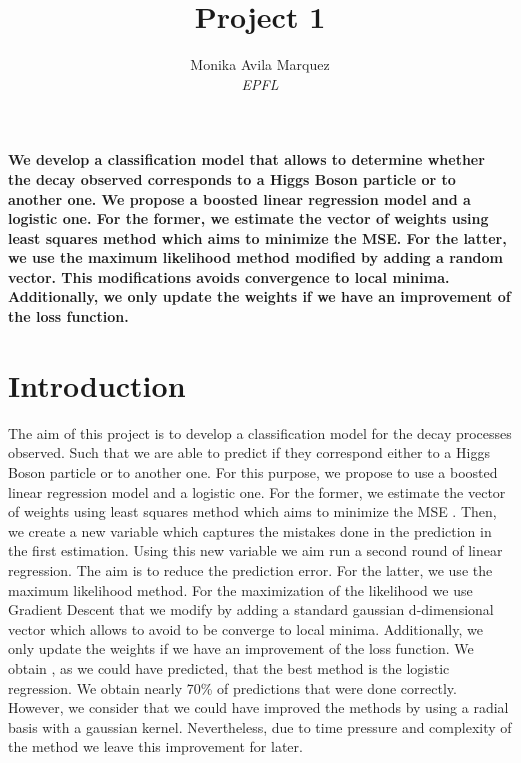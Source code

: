 \documentclass[10pt,conference,compsocconf]{IEEEtran}
\begin{document}
\title{Project 1}

\author{
  Monika Avila Marquez \\
  \textit{EPFL}
}

\maketitle

\begin{abstract}
  
\end{abstract}	\textbf{We develop a classification model that allows to determine whether the decay observed corresponds to a Higgs Boson particle or to another one. We propose a boosted linear regression model and a logistic one. For the former, we estimate the vector of weights using least squares method which aims to minimize the MSE. For the latter, we use the maximum likelihood method modified by adding a random vector. This modifications avoids convergence to local minima. Additionally, we only update the weights if we have an improvement of the loss function. }

\section{Introduction}

The aim of this project is to develop a classification model for the decay processes observed. Such that we are able to predict if they correspond either to a Higgs Boson particle or to another one. For this purpose, we propose to use a  boosted linear regression model and a logistic one. For the former, we estimate the vector of weights using least squares method which aims to minimize the MSE . Then, we create a new variable which captures the mistakes done in the prediction in the first estimation. Using this new variable we aim run a second round of linear regression. The aim is to reduce the prediction error. For the latter, we use the maximum likelihood method. For the maximization of the likelihood we use Gradient Descent that we modify by adding a standard gaussian d-dimensional vector which allows to avoid to be converge to local minima. Additionally, we only update the weights if we have an improvement of the loss function.
We obtain , as we could have predicted, that the best method is the logistic regression. We obtain nearly 70\% of predictions that were done correctly. 
However, we consider that we could have improved the methods by using a radial basis with a gaussian kernel. Nevertheless, due to time pressure and complexity of the method we leave this improvement for later.
\end{document}
